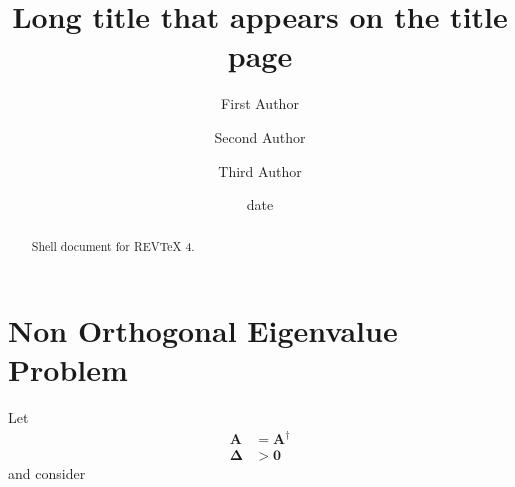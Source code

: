 \documentclass[aps,preprint]{revtex4}%
\begin{document}
\title[Short title for running header]{Long title that appears on the title page}
\author{First Author}
\author{Second Author}
\author{Third Author}

\begin{abstract}
Shell document for REV\TeX{} 4.

\end{abstract}
\date[Date text]{date}




\maketitle
\tableofcontents


\section{Non Orthogonal Eigenvalue Problem}

Let
\begin{align}
\mathbf{A} &  =\mathbf{A}^{\dagger}\\
\mathbf{\Delta} &  \mathbf{>0}%
\end{align}
and consider%
\end{document}
